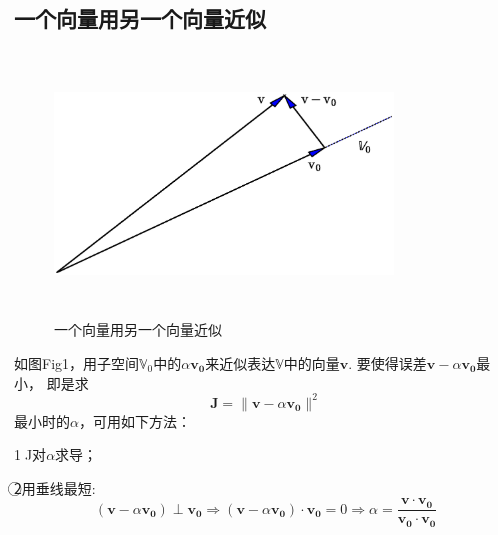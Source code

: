 \documentclass{article}
\begin{document}
\begin{CJK}{UTF8}{gbsn}
\section{一个向量用另一个向量近似}
\begin{figure}[H]
\centering  
\includegraphics[height=7cm,width=9cm]{fig1.eps}  
\caption{一个向量用另一个向量近似}
\label{1}  
\end{figure}
	如图Fig1，用子空间$\mathbb{V}_0$中的$\alpha\boldsymbol{v_0}$来近似表达$\mathbb{V}$中的向量$\boldsymbol{v}$.
	要使得误差$\boldsymbol{v}-\alpha\boldsymbol{v_0}$最小，
	即是求$$\boldsymbol{J}=\parallel\boldsymbol{v}-\alpha\boldsymbol{v_0}\parallel ^2$$最小时的$\alpha$，可用如下方法：\par
	\indent\textcircled{1}J对$\alpha$求导；\par
	\indent\textcircled{2}用垂线最短:
	$$(\boldsymbol{v}-\alpha\boldsymbol{v_0})\perp\boldsymbol{v_0} 
	\Rightarrow
	(\boldsymbol{v}-\alpha\boldsymbol{v_0})\cdot\boldsymbol{v_0}=0
	\Rightarrow
	\alpha =\frac{\boldsymbol{v}\cdot\boldsymbol{v_0}}{\boldsymbol{v_0}\cdot\boldsymbol{v_0}}$$\\



\end{CJK}
\end{document}
